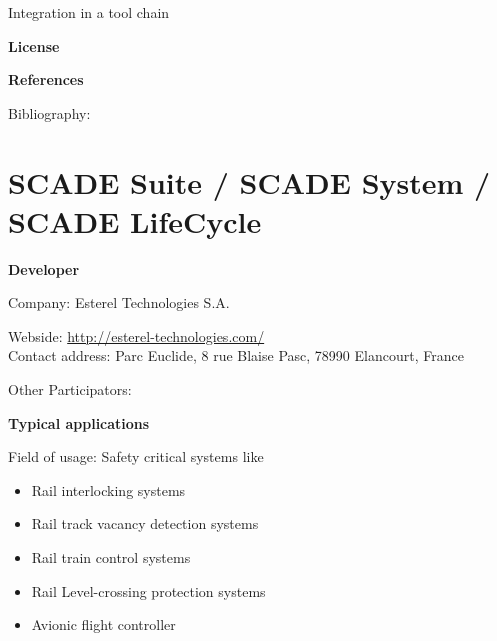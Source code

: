 \documentclass{./template/openetcs_report}
\begin{document}


	Integration in a tool chain



	\textbf{License}


	\textbf{References}

	Bibliography:


\section{SCADE Suite / SCADE System / SCADE LifeCycle}

	\textbf{Developer}

	Company: Esterel Technologies S.A.

	Webside: \url{http://esterel-technologies.com/} \\[2pt]

	Contact address: Parc Euclide, 8 rue Blaise Pasc, 78990 Elancourt, France

	Other  Participators:

	\textbf{Typical applications}

	Field of usage:
	Safety critical systems like
\vspace{-10pt}
\begin{itemize}[topsep=2pt, partopsep=2pt,itemsep=2pt,parsep=2pt]
  \item Rail interlocking systems
  \item Rail track vacancy detection systems
  \item Rail train control systems
  \item Rail Level-crossing protection systems
  \item Avionic flight controller
\end{itemize}
\end{document}

